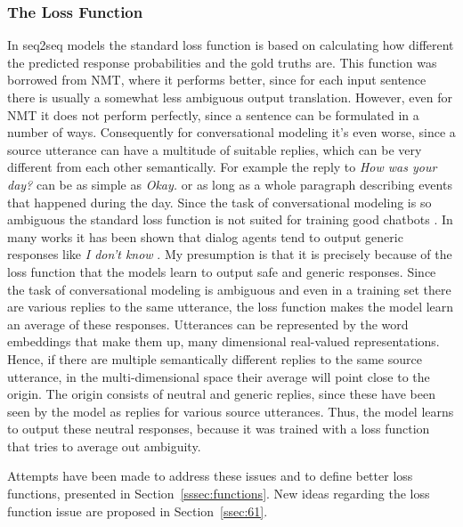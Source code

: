 \documentclass[12pt]{article}
\begin{document}
\subsubsection{The Loss Function} \label{sssec:loss_function}
In seq2seq models the standard loss function is based on calculating how different the predicted response probabilities and the gold truths are. This function was borrowed from NMT, where it performs better, since for each input sentence there is usually a somewhat less ambiguous output translation. However, even for NMT it does not perform perfectly, since a sentence can be formulated in a number of ways. Consequently for conversational modeling it's even worse, since a source utterance can have a multitude of suitable replies, which can be very different from each other semantically. For example the reply to \textit{How was your day?} can be as simple as \textit{Okay.} or as long as a whole paragraph describing events that happened during the day. Since the task of conversational modeling is so ambiguous the standard loss function is not suited for training good chatbots \cite{Vinyals:2015,Li:2015}. In many works it has been shown that dialog agents tend to output generic responses like \textit{I don't know} \cite{Vinyals:2015,Serban:2015,Li:2015,Li:2016,Jena:2017}. My presumption is that it is precisely because of the loss function that the models learn to output safe and generic responses. Since the task of conversational modeling is ambiguous and even in a training set there are various replies to the same utterance, the loss function makes the model learn an average of these responses. Utterances can be represented by the word embeddings that make them up, many dimensional real-valued representations. Hence, if there are multiple semantically different replies to the same source utterance, in the multi-dimensional space their average will point close to the origin. The origin consists of neutral and generic replies, since these have been seen by the model as replies for various source utterances. Thus, the model learns to output these neutral responses, because it was trained with a loss function that tries to average out ambiguity.

Attempts have been made to address these issues and to define better loss functions, presented in Section~\ref{sssec:functions}. New ideas regarding the loss function issue are proposed in Section~\ref{ssec:61}.
\end{document}
